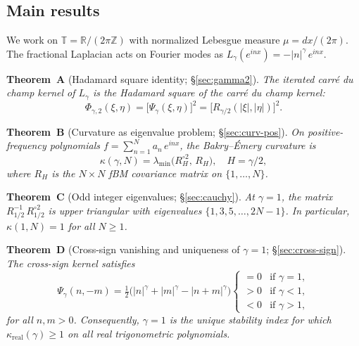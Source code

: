 \documentclass[11pt,a4paper]{article}
\theoremstyle{plain}
\theoremstyle{definition}
\theoremstyle{remark}
\newcommand{\R}{\mathbb{R}}
\newcommand{\Z}{\mathbb{Z}}
\newcommand{\T}{\mathbb{T}}
\begin{document}
\subsection{Main results}

We work on $\T = \R/(2\pi\Z)$ with normalized Lebesgue measure
$\mu = dx/(2\pi)$. The fractional Laplacian acts on Fourier modes as
$L_\gamma(e^{inx}) = -|n|^\gamma\,e^{inx}$.

\medskip\noindent
\textbf{Theorem~A} (Hadamard square identity; \S\ref{sec:gamma2}).
\emph{The iterated carr\'e du champ kernel of $L_\gamma$ is the
Hadamard square of the carr\'e du champ kernel:
\begin{equation}\label{eq:intro-A}
  \Phi_{\gamma,2}(\xi,\eta)
  = \bigl[\Psi_\gamma(\xi,\eta)\bigr]^2
  = \bigl[R_{\gamma/2}(|\xi|,|\eta|)\bigr]^2.
\end{equation}}

\medskip\noindent
\textbf{Theorem~B} (Curvature as eigenvalue problem; \S\ref{sec:curv-pos}).
\emph{On positive-frequency polynomials $f = \sum_{n=1}^N a_n\,e^{inx}$,
the Bakry--\'Emery curvature is
\begin{equation}\label{eq:intro-B}
  \kappa(\gamma, N) = \lambda_{\min}\!\bigl(R_H^{\circ 2},\, R_H\bigr),
  \quad H = \gamma/2,
\end{equation}
where $R_H$ is the $N \times N$ fBM covariance matrix on $\{1,\ldots,N\}$.}

\medskip\noindent
\textbf{Theorem~C} (Odd integer eigenvalues; \S\ref{sec:cauchy}).
\emph{At $\gamma = 1$, the matrix $R_{1/2}^{-1}\,R_{1/2}^{\circ 2}$ is
upper triangular with eigenvalues $\{1, 3, 5, \ldots, 2N-1\}$.
In particular, $\kappa(1,N) = 1$ for all $N \geq 1$.}

\medskip\noindent
\textbf{Theorem~D} (Cross-sign vanishing and uniqueness of $\gamma=1$; \S\ref{sec:cross-sign}).
\emph{The cross-sign kernel satisfies
\begin{equation}\label{eq:intro-D}
  \Psi_\gamma(n,-m) = \tfrac{1}{2}\bigl(|n|^\gamma + |m|^\gamma
  - |n+m|^\gamma\bigr)
  \begin{cases}
    = 0 & \text{if } \gamma = 1, \\
    > 0 & \text{if } \gamma < 1, \\
    < 0 & \text{if } \gamma > 1,
  \end{cases}
\end{equation}
for all $n,m > 0$. Consequently, $\gamma = 1$ is the unique stability
index for which $\kappa_{\mathrm{real}}(\gamma) \geq 1$ on all real
trigonometric polynomials.}
\end{document}

